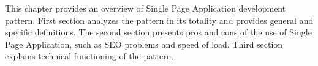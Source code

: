 This chapter provides an overview of Single Page Application development pattern. First section analyzes the pattern in its totality and provides general and specific definitions. The second section presents pros and cons of the use of Single Page Application, such as SEO problems and speed of load. Third section explains technical functioning of the pattern. 

